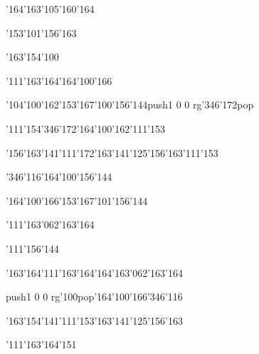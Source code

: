 \null\vfill\ipa\centerline{\enskip\enskip\enskip\enskip\enskip\enskip\enskip\enskip\char'164\char'163\char'105\char'160\char'164}\medskip\centerline{\enskip\enskip\enskip\enskip\enskip\enskip\enskip\char'153\char'101\char'156\char'163\enskip\enskip\enskip}\medskip\centerline{\enskip\enskip\enskip\char'163\char'154\char'100\enskip\enskip\enskip\enskip\enskip\enskip}\medskip\centerline{\enskip\enskip\enskip\enskip\char'111\char'163\char'164\enskip\enskip\enskip\enskip\char'164\char'100\char'166}\medskip\centerline{\enskip\char'104\char'100\char'162\enskip\char'153\char'167\char'100\char'156\char'144\enskip\enskip\enskip\enskip\enskip\enskip\enskip\pdfcolorstack\match push{1 0 0 rg}\char'346\char'172\pdfcolorstack\match pop{}}\medskip\centerline{\enskip\char'111\enskip\char'154\char'346\char'172\enskip\enskip\enskip\enskip\enskip\char'164\char'100\char'162\enskip\char'111\char'153}\medskip\centerline{\enskip\char'156\char'163\char'141\char'111\char'172\enskip\enskip\enskip\enskip\char'163\char'141\char'125\char'156\char'163\enskip\char'111\char'153}\medskip\centerline{\enskip\enskip\enskip\enskip\enskip\enskip\enskip\enskip\enskip\enskip\enskip\enskip}\medskip\centerline{\enskip\char'346\char'116\enskip\enskip\enskip\enskip\enskip\enskip\enskip\enskip\char'164\char'100\char'156\char'144}\medskip\vfill\footline{\hfil\tt\folio\hfil}\eject
\null\vfill\ipa\centerline{\enskip\enskip\enskip\enskip\char'164\char'100\char'166\enskip\char'153\char'167\char'101\char'156\char'144}\medskip\centerline{\enskip\char'111\enskip\enskip\enskip\enskip\enskip\char'163\char'062\char'163\char'164\enskip\enskip\enskip}\medskip\centerline{\enskip\enskip\enskip\enskip\enskip\enskip\enskip\enskip\enskip\enskip\enskip\enskip}\medskip\centerline{\enskip\enskip\enskip\enskip\char'111\char'156\char'144\enskip\enskip\enskip\enskip\enskip\enskip\enskip}\medskip\centerline{\enskip\enskip\enskip\enskip\enskip\char'163\char'164\char'111\char'163\char'164\enskip\char'164\char'163\char'062\char'163\char'164\enskip\enskip\enskip}\medskip\centerline{\enskip\pdfcolorstack\match push{1 0 0 rg}\char'100\pdfcolorstack\match pop{}\enskip\char'164\char'100\char'166\enskip\enskip\enskip\enskip\enskip\enskip\enskip\enskip\enskip\char'346\char'116}\medskip\centerline{\enskip\char'163\char'154\char'141\char'111\char'153\enskip\enskip\enskip\enskip\char'163\char'141\char'125\char'156\char'163\enskip\enskip\enskip}\medskip\centerline{\enskip\char'111\enskip\char'163\char'164\char'151\enskip\enskip\enskip\enskip\enskip\enskip}\medskip\centerline{\enskip\enskip\enskip\enskip\enskip\enskip\enskip\enskip\enskip\enskip\enskip\enskip\enskip\enskip\enskip}\medskip\vfill\footline{\hfil\tt\folio\hfil}\eject
